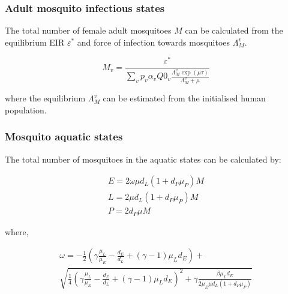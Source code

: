\documentclass{bmcart}
\begin{document}
\begin{backmatter}
\subsubsection*{Adult mosquito infectious states}

The total number of female adult mosquitoes $M$ can be calculated from the equilibrium EIR $\varepsilon^\ast$ and force of infection towards mosquitoes $\Lambda_M^v$.

\[
M_v = \frac{\varepsilon^\ast}{\sum_v p_v \alpha_v Q0_v \frac{\Lambda_M^v \exp(\mu \tau)}{\Lambda_M^v + \mu}}
\]

where the equilibrium $\Lambda_M^v$ can be estimated from the initialised human population.

\subsubsection*{Mosquito aquatic states}

The total number of mosquitoes in the aquatic states can be calculated by:

\begin{gather*}
    E = 2\omega\mu d_L(1 + d_P\mu_P)M \\
    L = 2\mu d_L(1 + d_P\mu_P)M \\
    P = 2d_P\mu M
\end{gather*}

where,

\begin{multline*}
\omega = - \frac{1}{2}\left(\gamma\frac{\mu_L}{\mu_E} - \frac{d_E}{d_L} + (\gamma - 1) \mu_L d_E\right) + \\
\sqrt{\frac{1}{4}\left(\gamma\frac{\mu_L}{\mu_E} - \frac{d_E}{d_L} + (\gamma - 1) \mu_L d_E\right)^2 + \gamma\frac{\beta\mu_L d_E}{2\mu_E\mu d_L(1 + d_P\mu_P)}}
\end{multline*}

\end{backmatter}
\end{document}
